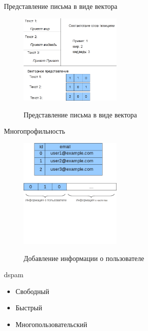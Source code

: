 \documentclass{beamer}
\begin{document}
\begin{frame}{Представление письма в виде вектора}
\begin{figure}[h]
\begin{center}
    \includegraphics[width=5cm]{../img/vectorize}
\end{center}
    Представление письма в виде вектора
\end{figure}
\end{frame}

\begin{frame}{Многопрофильность}
\begin{figure}[h]
\begin{center}
    \includegraphics[width=5cm]{../img/add_uid}
\end{center}
	Добавление информации о пользователе
\end{figure}
\end{frame}



\begin{frame}{dspam}
    \begin{itemize}
        \item Свободный
        \item Быстрый
        \item Многопользовательский
    \end{itemize}
\end{frame}
\end{document}
